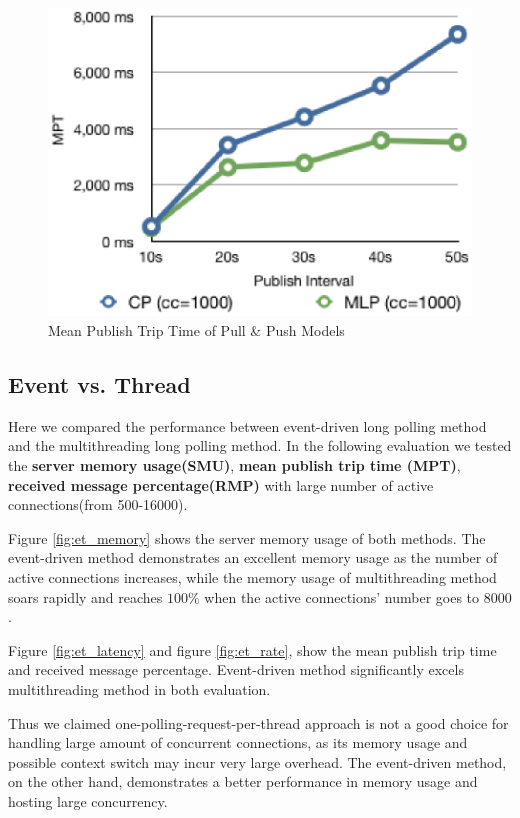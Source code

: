 \begin{figure}[htb!]
\centering%
    \includegraphics[scale=0.70]{figures/latency.eps}
    \caption{Mean Publish Trip Time of Pull \& Push Models}
    \label{fig:traffic_latency}
\end{figure}

\subsection{Event vs. Thread\\}

Here we compared the performance between event-driven long polling method
and the multithreading long polling method. In the following evaluation
we tested the {\bf server memory usage(SMU)}, {\bf mean publish trip time
(MPT)}, {\bf received message percentage(RMP)} with large number of
active connections(from 500-16000).

Figure \ref{fig:et_memory} shows the server memory usage of both methods.
The event-driven method demonstrates an excellent memory usage as the
number of active connections increases, while the memory usage of 
multithreading method soars rapidly and reaches $100\%$ when the active
connections' number goes to $8000$.

Figure \ref{fig:et_latency} and figure \ref{fig:et_rate}, show the mean
publish trip time and received message percentage. Event-driven method 
significantly excels multithreading method in both evaluation.

Thus we claimed one-polling-request-per-thread approach is not a good 
choice for handling large amount of concurrent connections, as its
memory usage and possible context switch may incur very large overhead.
The event-driven method, on the other hand, demonstrates a better 
performance in memory usage and hosting large concurrency.  

